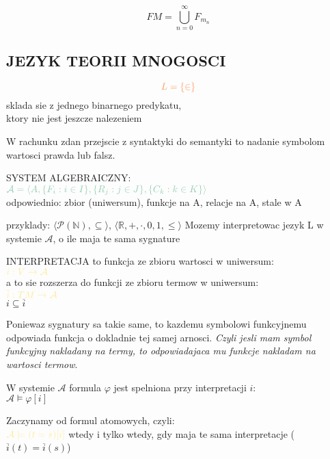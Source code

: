 \documentclass{article}
\newcommand{\R}{\mathbb{R}}
\newcommand{\N}{\mathbb{N}}
\begin{document}
    $$FM=\bigcup\limits_{n=0}^\infty F_{m_n}$$
\smallskip\subsection*{\color{tit}JEZYK TEORII MNOGOSCI}
  \begin{center}
    $$\color{def}L=\{\in\}$$
    sklada sie z \color{acc}jednego binarnego predykatu\color{txt}, \\ktory nie jest jeszcze nalezeniem
  \end{center}
  W rachunku zdan przejscie z syntaktyki do semantyki to nadanie symbolom wartosci prawda lub falsz.\bigskip
  \begin{center}
    \color{def}SYSTEM ALGEBRAICZNY:\color{txt}\smallskip\\
    $\color{emp}\mathcal{A} = \langle A, \{F_i:i\in I\}, \{R_j:j\in J\}, \{C_k:k\in K\}\rangle$\smallskip\\
    odpowiednio: zbior (uniwersum), funkcje na A, relacje na A, stale w A
  \end{center}
  przyklady: $\langle \mathcal{P}(\N), \subseteq\rangle$, $\langle\R, +, \cdot, 0, 1, \leq\rangle$
  Mozemy interpretowac jezyk L w systemie $\mathcal{A}$, o ile maja te sama sygnature
  \begin{center}
    \color{def}INTERPRETACJA \color{txt}to funkcja ze zbioru wartosci w uniwersum:\smallskip\\
    $\color{acc}i:V\to\mathcal{A}$\smallskip\\
    a to sie rozszerza do funkcji ze zbioru termow w uniwersum:\smallskip\\
    $\color{acc}\overline{i}:TM\to\mathcal{A}$\smallskip\\
    $i\subseteq\overline{i}$
  \end{center}
  Poniewaz sygnatury sa takie same, to kazdemu symbolowi funkcyjnemu odpowiada funkcja o dokladnie tej samej arnosci. \emph{Czyli jesli mam symbol funkcyjny nakladany na termy, to odpowiadajaca mu funkcje nakladam na wartosci termow}.
  \begin{center}
    \color{emp}W systemie $\mathcal{A}$ formula $\varphi$ jest spelniona przy interpretacji $i$:\color{txt}\\
    \color{acc}$\mathcal{A}\models\varphi[i]$
  \end{center}
  Zaczynamy od \color{def}formul atomowych\color{txt}, czyli:\smallskip\\
  $\color{acc}\mathcal{A}\models(t=s)[i]$ wtedy i tylko wtedy, gdy maja te sama interpretacje ($\overline{i}(t) = \overline{i}(s)$)\smallskip\\
\end{document}
